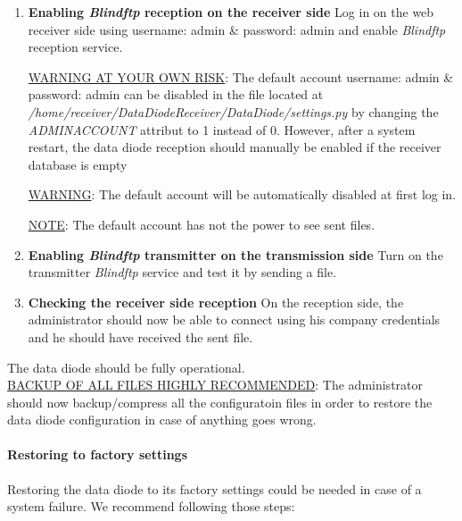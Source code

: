 \documentclass[a4paper,10pt]{article}
\begin{document}
\begin{enumerate}
\item \textbf{Enabling \emph{Blindftp} reception on the receiver side} Log in on the web receiver side using username: admin \& password: admin and enable \emph{Blindftp} reception service.

\underline{WARNING AT YOUR OWN RISK}: The default account username: admin \& password: admin can be disabled in the file located at \emph{/home/receiver/DataDiodeReceiver/DataDiode/settings.py} by changing the \emph{ADMINACCOUNT} attribut to 1 instead of 0. However, after a system restart, the data diode reception should manually be enabled if the receiver database is empty

\underline{WARNING}: The default account will be automatically disabled at first log in.

\underline{NOTE}: The default account has not the power to see sent files.

\item \textbf{Enabling \emph{Blindftp} transmitter on the transmission side} Turn on the transmitter \emph{Blindftp} service and test it by sending a file.

\item \textbf{Checking the receiver side reception} On the reception side, the administrator should now be able to connect using his company credentials and he should have received the sent file.

\end{enumerate}
The data diode should be fully operational. \\  
\underline{BACKUP OF ALL FILES HIGHLY RECOMMENDED}: The administrator should now backup/compress all the configuratoin files in order to restore the data diode configuration in case of anything goes wrong.
\paragraph{Restoring to factory settings}
Restoring the data diode to its factory settings could be needed in case of a system failure. We recommend following those steps:
\end{document}
